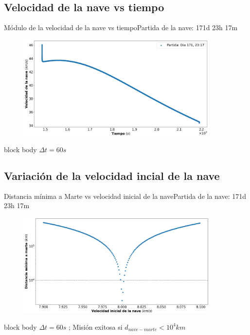 \documentclass{beamer}
\begin{document}
        \subsection{Velocidad de la nave vs tiempo}

            \begin{frame}{Módulo de la velocidad de la nave vs tiempo}{Partida de la nave: 171d 23h 17m}
                \begin{figure}[H!]
                    \includegraphics[width=0.9\textwidth]{./velocity_vs_time_for_travel_to_mars}
                    \label{fig:marte_8}
                \end{figure}
                \begin{beamercolorbox}[sep=5pt,center]{block body}
                    \centering
                    \small{$\Delta t = 60s$}
                \end{beamercolorbox}
            \end{frame}

        \subsection{Variación de la velocidad incial de la nave}

            \begin{frame}{Distancia mínima a Marte vs velocidad inicial de la nave}{Partida de la nave: 171d 23h 17m}
                \begin{figure}[H!]
                    \includegraphics[width=0.9\textwidth]{./min_distance_vs_v0_logaritmica_line_in_10^4_scatter}
                    \label{fig:marte_9}
                \end{figure}
                \begin{beamercolorbox}[sep=5pt,center]{block body}
                    \centering
                    \small{$\Delta t = 60s$ ; Misión exitosa si $d_{nave-marte} < 10^4 km$}
                \end{beamercolorbox}
            \end{frame}
\end{document}
